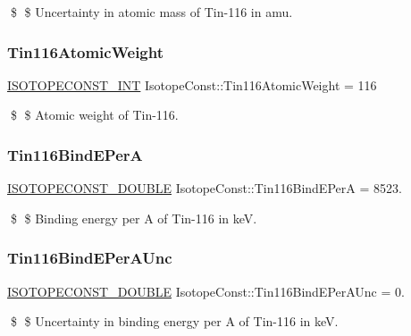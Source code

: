 \$ \$ Uncertainty in atomic mass of Tin-\/116 in amu. \mbox{\label{group___isotope_const-_tin-_sn116_ga1bfb6b849550afcb9e222838e3a1873d}} 
\subsubsection{\texorpdfstring{Tin116\+Atomic\+Weight}{Tin116AtomicWeight}}
{\footnotesize\ttfamily \mbox{\hyperlink{group___isotope_const-_macros_ga5f18360b3e99483a35c32d789e62621c}{I\+S\+O\+T\+O\+P\+E\+C\+O\+N\+S\+T\+\_\+\+I\+NT}} Isotope\+Const\+::\+Tin116\+Atomic\+Weight = 116}

\$ \$ Atomic weight of Tin-\/116. \mbox{\label{group___isotope_const-_tin-_sn116_ga46fbaf9fd44916990c454337812b4be3}} 
\subsubsection{\texorpdfstring{Tin116\+Bind\+E\+PerA}{Tin116BindEPerA}}
{\footnotesize\ttfamily \mbox{\hyperlink{group___isotope_const-_macros_ga8f45a7272ce02c0b4c65c44636ed719a}{I\+S\+O\+T\+O\+P\+E\+C\+O\+N\+S\+T\+\_\+\+D\+O\+U\+B\+LE}} Isotope\+Const\+::\+Tin116\+Bind\+E\+PerA = 8523.}

\$ \$ Binding energy per A of Tin-\/116 in keV. \mbox{\label{group___isotope_const-_tin-_sn116_ga472280d5be820f0785ab11eeba9c6c19}} 
\subsubsection{\texorpdfstring{Tin116\+Bind\+E\+Per\+A\+Unc}{Tin116BindEPerAUnc}}
{\footnotesize\ttfamily \mbox{\hyperlink{group___isotope_const-_macros_ga8f45a7272ce02c0b4c65c44636ed719a}{I\+S\+O\+T\+O\+P\+E\+C\+O\+N\+S\+T\+\_\+\+D\+O\+U\+B\+LE}} Isotope\+Const\+::\+Tin116\+Bind\+E\+Per\+A\+Unc = 0.}

\$ \$ Uncertainty in binding energy per A of Tin-\/116 in keV. \mbox{\label{group___isotope_const-_tin-_sn116_ga284e0f206420236ca354026dc0454439}} 
